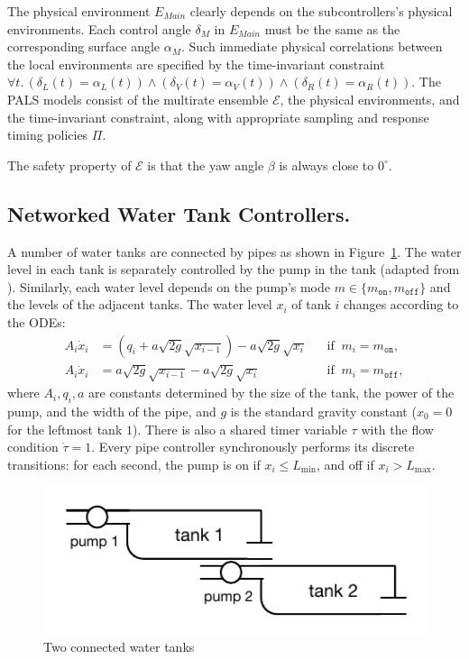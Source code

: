 The physical environment $E_\mathit{Main}$ clearly depends on the subcontrollers's physical environments.
Each control angle $\delta_M$ in  $E_\mathit{Main}$ must be the same as the corresponding surface angle $\alpha_M$.
Such  immediate physical correlations between the local environments are specified by the time-invariant constraint
%
$\forall t.\, (\delta_L(t) = \alpha_L(t)) \wedge (\delta_V(t) = \alpha_V(t)) \wedge (\delta_R(t) = \alpha_R(t))$.
%
The PALS models consist of the multirate ensemble $\mathcal{E}$, the physical environments, and the time-invariant constraint,
along with appropriate  sampling and response timing policies $\Pi$.

The safety property of $\mathcal{E}$ 
is that 
the yaw angle $\beta$ is always close to $0^\circ$.






\subsection{Networked Water Tank Controllers.}

A number of water tanks are connected by pipes as shown in Figure~\ref{fig:water}.
The water level in each tank is separately controlled by the pump in the tank
(adapted from \cite{kowalewski1999case,raisch1999approximating}).
Similarly, each water level depends on the pump's mode $m \in \{m_\texttt{on}, m_\texttt{off}\}$
and the levels of the adjacent tanks.
The water level $x_i$ of tank $i$ changes according to the ODEs:
\[
\begin{aligned}
A_i \dot{x}_i &=  (q_i + a \sqrt{2g} \sqrt{x_{i-1}})  - a \sqrt{2g} \sqrt{x_i}
&& \mbox{if}\;\; m_i = m_\texttt{on},
\\
A_i \dot{x}_i &= a \sqrt{2g} \sqrt{x_{i-1}}  - a \sqrt{2g} \sqrt{x_i}
&& \mbox{if}\;\; m_i = m_\texttt{off},
\end{aligned}
\]
where $A_i, q_i, a $ are constants determined by the size of the tank, the power of the pump, 
and the width of the pipe,
and $g$ is the standard gravity constant ($x_0 = 0$ for the leftmost tank $1$).
%
There is also a shared timer variable $\tau$ 
with the flow condition $\dot{\tau} = 1$.
Every pipe controller synchronously performs its discrete transitions:
for each second, 
the pump is on if $x_i \leq L_{\min}$, and off if $x_i > L_{\max}$.

\begin{figure}
\centering
\includegraphics[clip=true,trim=0.3cm 0.35cm 0.3cm 0.35cm,width=0.6\columnwidth]{water.pdf}    
\caption{Two connected water tanks}  \label{fig:water}
\end{figure}




